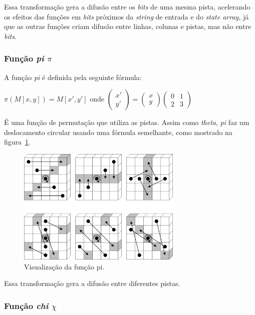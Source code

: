 Essa transformação gera a difusão entre os \textit{bits} de uma mesma pista,
acelerando os efeitos das funções em \textit{bits} próximos da \textit{string}
de entrada e do \textit{state array}, já que as outras funções criam difusão
entre linhas, colunas e pistas, mas não entre \textit{bits}.

\subsubsection{Função \textit{pi} $\pi$}

A função \textit{pi} é definida pela seguinte fórmula:

$\pi(M[x, y]) = M[x', y'] \mbox{ onde }
\begin{pmatrix}x' \\ y'\end{pmatrix} =
\begin{pmatrix}x \\ y\end{pmatrix}
\begin{pmatrix}0 & 1 \\ 2 & 3\end{pmatrix}$

É uma função de permutação que utiliza as pistas. Assim como \textit{theta},
\textit{pi} faz um deslocamento circular usando uma fórmula semelhante, como
mostrado na figura~\ref{fig:pi}.

\begin{figure}[ht]
    \centering
    \includegraphics[width=0.7\textwidth]{images/pi.png}
    \caption{Visualização da função pi.}
    \label{fig:pi}
\end{figure}

Essa transformação gera a difusão entre diferentes pistas.

\subsubsection{Função \textit{chi} $\chi$}

